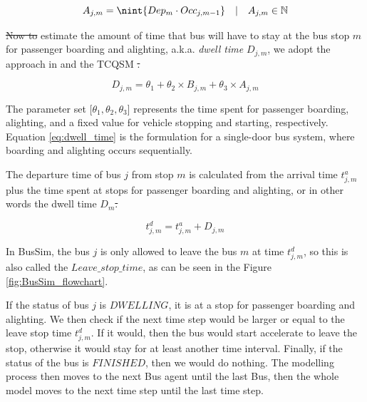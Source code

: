 \documentclass[11pt]{article}
\DeclarePairedDelimiter{\nint}\lfloor\rceil
\providecommand{\DIFaddtex}[1]{{\protect\color{blue}\uwave{#1}}} %
\providecommand{\DIFdeltex}[1]{{\protect\color{red}\sout{#1}}}                      %
\providecommand{\DIFaddbegin}{} %
\providecommand{\DIFaddend}{} %
\providecommand{\DIFdelbegin}{} %
\providecommand{\DIFdelend}{} %
\providecommand{\DIFadd}[1]{\texorpdfstring{\DIFaddtex{#1}}{#1}} %
\providecommand{\DIFdel}[1]{\texorpdfstring{\DIFdeltex{#1}}{}} %
\newcommand{\DIFscaledelfig}{0.5}
\newlength{\DIFdelgraphicswidth} %
\newlength{\DIFdelgraphicsheight} %
\newcommand{\DIFaddincludegraphics}[2][]{{\color{blue}\fbox{\DIFOincludegraphics[#1]{#2}}}} %
\newcommand{\DIFdelincludegraphics}[2][]{%
\sbox{\DIFdelgraphicsbox}{\DIFOincludegraphics[#1]{#2}}%
\settoboxwidth{\DIFdelgraphicswidth}{\DIFdelgraphicsbox} %
\settoboxtotalheight{\DIFdelgraphicsheight}{\DIFdelgraphicsbox} %
\scalebox{\DIFscaledelfig}{%
\parbox[b]{\DIFdelgraphicswidth}{\usebox{\DIFdelgraphicsbox}\\[-\baselineskip] \rule{\DIFdelgraphicswidth}{0em}}\llap{\resizebox{\DIFdelgraphicswidth}{\DIFdelgraphicsheight}{%
\setlength{\unitlength}{\DIFdelgraphicswidth}%
\begin{picture}(1,1)%
\thicklines\linethickness{2pt} %
{\color[rgb]{1,0,0}\put(0,0){\framebox(1,1){}}}%
{\color[rgb]{1,0,0}\put(0,0){\line( 1,1){1}}}%
{\color[rgb]{1,0,0}\put(0,1){\line(1,-1){1}}}%
\end{picture}%
}\hspace*{3pt}}} %
} %
\DeclareRobustCommand{\DIFaddbegin}{\DIFOaddbegin \let\includegraphics\DIFaddincludegraphics} %
\DeclareRobustCommand{\DIFaddend}{\DIFOaddend \let\includegraphics\DIFOincludegraphics} %
\DeclareRobustCommand{\DIFdelbegin}{\DIFOdelbegin \let\includegraphics\DIFdelincludegraphics} %
\DeclareRobustCommand{\DIFdelend}{\DIFOaddend \let\includegraphics\DIFOincludegraphics} %
\begin{document}
\DIFdelend \DIFaddbegin \DIFadd{: 
    }\DIFaddend \begin{equation}
        A_{j,m} = \nint{Dep_m \cdot Occ_{j,m-1}} \quad | \quad A_{j,m}\in\mathbb{N}
    \end{equation}

\DIFdelbegin \DIFdel{Now to }\DIFdelend \DIFaddbegin \DIFadd{To }\DIFaddend estimate the amount of time that bus will have to stay at the bus stop $m$ for passenger boarding and alighting, a.k.a. \textit{dwell time} $D_{j,m}$, we adopt the approach in \citet{bertini2004modeling} and the TCQSM \citep{kfh2013transit}\DIFdelbegin \DIFdel{. 
}%

\DIFdelend \DIFaddbegin \DIFadd{:
}\DIFaddend \begin{equation}
D_{j,m} = \theta_1 + \theta_2 \times B_{j,m} + \theta_3 \times A_{j,m} 
\label{eq:dwell_time}
\end{equation}
\DIFdelbegin %

\DIFdelend The parameter set [$\theta_1,\theta_2,\theta_3$] represents the time spent for passenger boarding, alighting, and a fixed value for vehicle stopping and starting, respectively. Equation \ref{eq:dwell_time} is the formulation for a single-door bus system, where boarding and alighting occurs sequentially. 

The departure time of bus $j$ from stop $m$ is calculated from the arrival time $t^a_{j,m}$ plus the time spent at stops for passenger boarding and alighting, or in other words the dwell time $D_m$\DIFdelbegin \DIFdel{. 
}%

\DIFdelend \DIFaddbegin \DIFadd{:
}\DIFaddend \begin{equation}
	 t^d_{j,m} = t^a_{j,m} + D_{j,m}
\end{equation}
\DIFdelbegin %

\DIFdelend In BusSim, the bus $j$ is only allowed to leave the bus $m$ at time $t^d_{j,m}$, so this is also called the $Leave\_stop\_time$, as can be seen in the Figure \ref{fig:BusSim_flowchart}. 

If the status of bus $j$ is $DWELLING$, it is at a stop for passenger boarding and alighting. We then check if the next time step would be larger or equal to the leave stop time $t^d_{j,m}$. If it would, then the bus would start accelerate to leave the stop, otherwise it would stay for at least another time interval. Finally, if the status of the bus is $FINISHED$, then we would do nothing. The modelling process then moves to the next Bus agent until the last Bus, then the whole model moves to the next time step until the last time step. 
\end{document}
